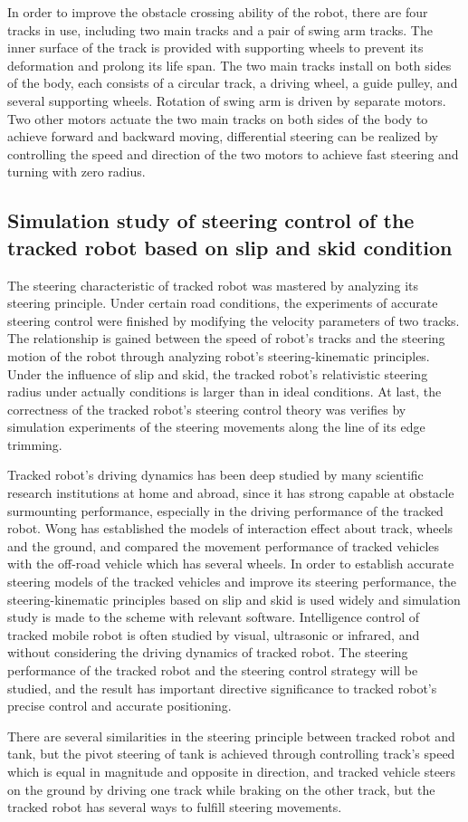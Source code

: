 \documentclass{romjist}
\begin{document}
In order to improve the obstacle crossing ability of the robot, there are four tracks in use, including two main tracks and a pair of swing arm tracks. The inner surface of the track is provided with supporting wheels to prevent its deformation and prolong its life span. The two main tracks install on both sides of the body, each consists of a circular track, a driving wheel, a guide pulley, and several supporting wheels. Rotation of swing arm is driven by separate motors. Two other motors actuate the two main tracks on both sides of the body to achieve forward and backward moving, differential steering can be realized by controlling the speed and direction of the two motors to achieve fast steering and turning with zero radius.
\subsection{Simulation study of steering control of the tracked robot based on slip and skid condition}
\cite{7}The steering characteristic of tracked robot was mastered by analyzing its steering principle. Under certain road conditions, the experiments of accurate steering control were finished by modifying the velocity parameters of two tracks. The relationship is gained between the speed of robot's tracks and the steering motion of the robot through analyzing robot's steering-kinematic principles. Under the influence of slip and skid, the tracked robot's relativistic steering radius under actually conditions is larger than in ideal conditions. At last, the correctness of the tracked robot's steering control theory was verifies by simulation experiments of the steering movements along the line of its edge trimming.\par
Tracked robot's driving dynamics has been deep studied by many scientific research institutions at home and abroad, since it has strong capable at obstacle surmounting performance, especially in the driving performance of the tracked robot. Wong has established the models of interaction effect about track, wheels and the ground, and compared the movement performance of tracked vehicles with the off-road vehicle which has several wheels. In order to establish accurate steering models of the tracked vehicles and improve its steering performance, the steering-kinematic principles based on slip and skid is used widely and simulation study is made to the scheme with relevant software. Intelligence control of tracked mobile robot is often studied by visual, ultrasonic or infrared, and without considering the driving dynamics of tracked robot. The steering performance of the tracked robot and the steering control strategy will be studied, and the result has important directive significance to tracked robot's precise control and accurate positioning.\par
There are several similarities in the steering principle between tracked robot and tank, but the pivot steering of tank is achieved through controlling track's speed which is equal in magnitude and opposite in direction, and tracked vehicle steers on the ground by driving one track while braking on the other track, but the tracked robot has several ways to fulfill steering movements.
\end{document}

